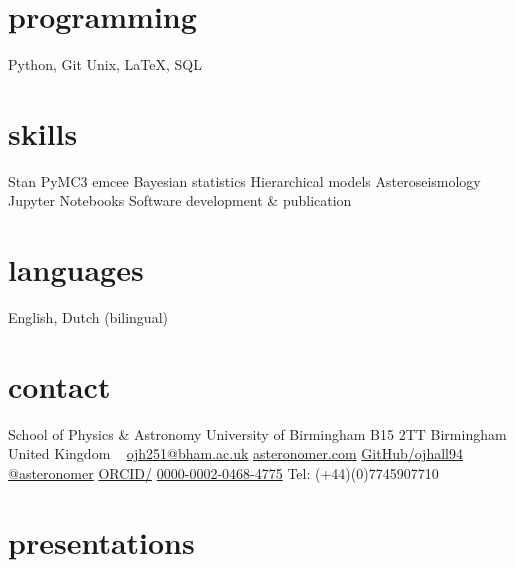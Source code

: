 \documentclass[letterpaper]{k-cv} %
\begin{document}


\begin{aside} %
\section{\color{c1}programming}
\bodyfont Python, Git
Unix, LaTeX,
SQL
\section{\color{c2}skills}
Stan
PyMC3
emcee 
Bayesian statistics
Hierarchical models
Asteroseismology
Jupyter Notebooks
Software development \& publication
\section{\color{c3}languages}
English, Dutch (bilingual)
\section{\color{c4}contact}
School of Physics \& Astronomy
University of Birmingham
B15 2TT
Birmingham
United Kingdom
~
\href{mailto:ojh251@student.bham.ac.uk}{ojh251@bham.ac.uk}
\href{http://www.asteronomer.com}{asteronomer.com}
\href{http://www.github.com/ojhall94}{GitHub/ojhall94}
\href{http://www.twitter.com/asteronomer}{@asteronomer}
\href{http://www.orcid.com/0000-0002-0468-4775}{ORCID/}
\href{http://www.orcid.com/0000-0002-0468-4775}{0000-0002-0468-4775}
Tel: (+44)(0)7745907710
\end{aside}

\section{\color{c1}presentations}
\end{document}
